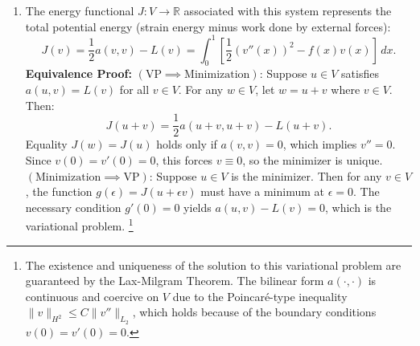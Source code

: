 \begin{solution}
\begin{enumerate}
    \item[(b)] The energy functional $J: V \to \mathbb{R}$ associated with this system represents the total potential energy (strain energy minus work done by external forces):
    \[
    J(v) = \frac{1}{2} a(v, v) - L(v) = \int_0^1 \left[ \frac{1}{2} (v''(x))^2 - f(x)v(x) \right] \, dx.
    \]
    \textbf{Equivalence Proof:}
    $(\text{VP} \implies \text{Minimization})$: Suppose $u \in V$ satisfies $a(u, v) = L(v)$ for all $v \in V$. For any $w \in V$, let $w = u + v$ where $v \in V$. Then:
    \[
    J(u + v) = \frac{1}{2} a(u + v, u + v) - L(u + v).
    \]
    Equality $J(w) = J(u)$ holds only if $a(v, v) = 0$, which implies $v'' = 0$. Since $v(0) = v'(0) = 0$, this forces $v \equiv 0$, so the minimizer is unique.
    $(\text{Minimization} \implies \text{VP})$: Suppose $u \in V$ is the minimizer. Then for any $v \in V$, the function $g(\epsilon) = J(u + \epsilon v)$ must have a minimum at $\epsilon = 0$.
    The necessary condition $g'(0) = 0$ yields $a(u, v) - L(v) = 0$, which is the variational problem. \footnote{The existence and uniqueness of the solution to this variational problem are guaranteed by the Lax-Milgram Theorem. The bilinear form $a(\cdot, \cdot)$ is continuous and coercive on $V$ due to the Poincaré-type inequality $\|v\|_{H^2} \leq C \|v''\|_{L_2}$, which holds because of the boundary conditions $v(0)=v'(0)=0$.}


\end{enumerate}
\end{solution}
